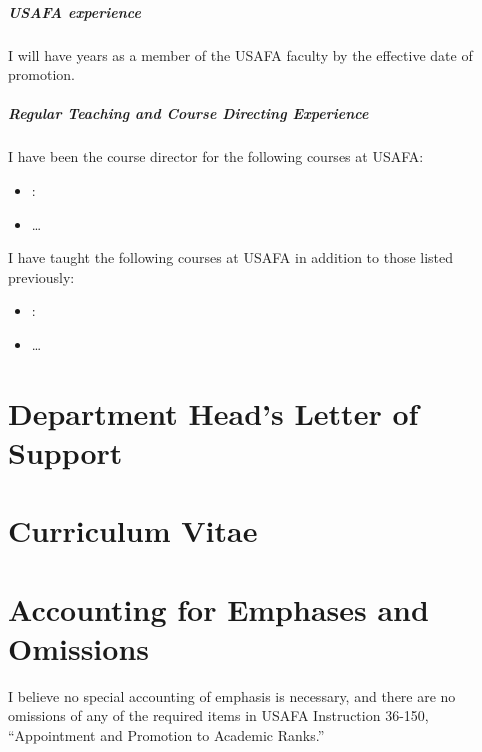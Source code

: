 \documentclass[11pt,openany,oneside]{book}
\begin{document}
\paragraph{USAFA experience}
I will have  years as a member of the \gls{USAFA} faculty by the effective date of promotion.

\paragraph{Regular Teaching and Course Directing Experience}
I have been the course director for the following courses at \gls{USAFA}:
\begin{itemize}
  \item {}:  
  \item \dots
\end{itemize}
I have taught the following courses at \gls{USAFA} in addition to those listed previously:
\begin{itemize}
  \item {}:  
  \item \dots
\end{itemize}

\chapter{Department Head's Letter of Support}  %

%

\chapter{Curriculum Vitae}\label{section:cv}  %

%

\chapter{Accounting for Emphases and Omissions}  %

I believe no special accounting of emphasis is necessary, and there are no omissions of any of the required items in \gls{USAFA} Instruction 36-150, ``Appointment and Promotion to Academic Ranks.''
\end{document}
